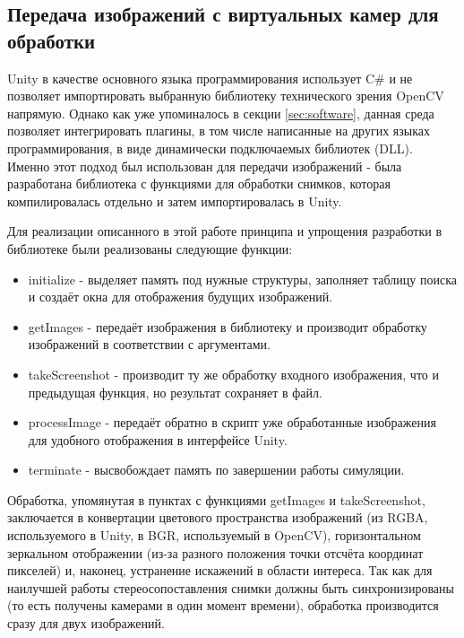 \subsection{Передача изображений с виртуальных камер для обработки}

Unity в качестве основного языка программирования использует C\# и не позволяет импортировать 
выбранную библиотеку технического зрения OpenCV напрямую. Однако как уже упоминалось в секции 
\ref{sec:software}, данная среда позволяет интегрировать плагины, в том числе написанные на 
других языках программирования, в виде динамически подключаемых библиотек (DLL). Именно этот 
подход был использован для передачи изображений - была разработана библиотека с функциями для 
обработки снимков, которая компилировалась отдельно и затем импортировалась в Unity. 

Для реализации описанного в этой работе принципа и упрощения разработки в библиотеке были реализованы 
следующие функции:
\begin{itemize}
    \item initialize - выделяет память под нужные структуры, заполняет таблицу поиска и создаёт окна 
    для отображения будущих изображений.
    \item getImages - передаёт изображения в библиотеку и производит обработку изображений в 
    соответствии с аргументами. 
    \item takeScreenshot - производит ту же обработку входного изображения, что и предыдущая функция,
     но результат сохраняет в файл. 
    \item processImage - передаёт обратно в скрипт уже обработанные изображения для удобного отображения
    в интерфейсе Unity. 
    \item terminate - высвобождает память по завершении работы симуляции.      
\end{itemize}

Обработка, упомянутая в пунктах с функциями getImages и takeScreenshot, заключается в конвертации 
цветового пространства изображений (из RGBA, используемого в Unity, в BGR, используемый в OpenCV), 
горизонтальном зеркальном отображении (из-за разного положения точки отсчёта координат пикселей)
и, наконец, устранение искажений в области интереса. Так как для наилучшей работы стереосопоставления
снимки должны быть синхронизированы (то есть получены камерами в один момент времени), обработка        %
производится сразу для двух изображений. 

